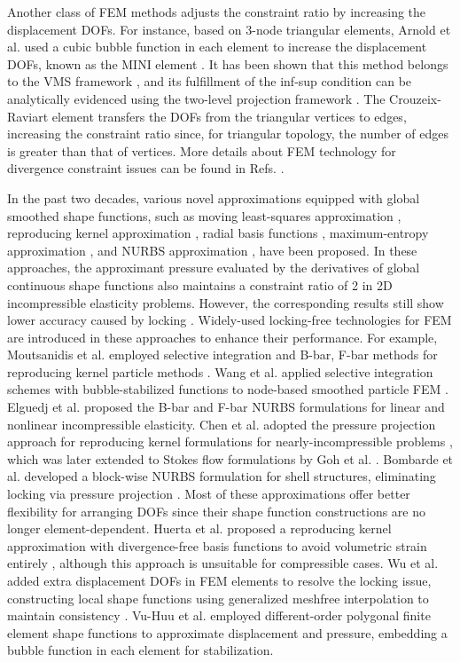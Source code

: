 Another class of FEM methods adjusts the constraint ratio by increasing the displacement DOFs. For instance, based on 3-node triangular elements, Arnold et al. used a cubic bubble function in each element to increase the displacement DOFs, known as the MINI element \cite{arnold1984,auricchio2005}. It has been shown that this method belongs to the VMS framework \cite{quarteroni1994}, and its fulfillment of the inf-sup condition can be analytically evidenced using the two-level projection framework \cite{brezzi}. The Crouzeix-Raviart element \cite{crouzeix1973} transfers the DOFs from the triangular vertices to edges, increasing the constraint ratio since, for triangular topology, the number of edges is greater than that of vertices. More details about FEM technology for divergence constraint issues can be found in Refs. \cite{hughes2000,bathe1996,brink1996}.

In the past two decades, various novel approximations equipped with global smoothed shape functions, such as moving least-squares approximation \cite{belytschko1994}, reproducing kernel approximation \cite{liu1995}, radial basis functions \cite{chi2014,wang2020d}, maximum-entropy approximation \cite{ortiz-bernardin2015}, and NURBS approximation \cite{hughes2005,auricchio2010}, have been proposed. In these approaches, the approximant pressure evaluated by the derivatives of global continuous shape functions also maintains a constraint ratio of 2 in 2D incompressible elasticity problems. However, the corresponding results still show lower accuracy caused by locking \cite{huerta2001,dolbow1999a}. Widely-used locking-free technologies for FEM are introduced in these approaches to enhance their performance. For example, Moutsanidis et al. employed selective integration and B-bar, F-bar methods for reproducing kernel particle methods \cite{moutsanidis2020,moutsanidis2021}. Wang et al. applied selective integration schemes with bubble-stabilized functions to node-based smoothed particle FEM \cite{wang2022c}. Elguedj et al. proposed the B-bar and F-bar NURBS formulations for linear and nonlinear incompressible elasticity. Chen et al. adopted the pressure projection approach for reproducing kernel formulations for nearly-incompressible problems \cite{chen2000}, which was later extended to Stokes flow formulations by Goh et al. \cite{goh2018}. Bombarde et al. developed a block-wise NURBS formulation for shell structures, eliminating locking via pressure projection \cite{bombarde2022}. Most of these approximations offer better flexibility for arranging DOFs since their shape function constructions are no longer element-dependent. Huerta et al. proposed a reproducing kernel approximation with divergence-free basis functions to avoid volumetric strain entirely \cite{huerta2004a}, although this approach is unsuitable for compressible cases. Wu et al. added extra displacement DOFs in FEM elements to resolve the locking issue, constructing local shape functions using generalized meshfree interpolation to maintain consistency \cite{wu2012}. Vu-Huu et al. employed different-order polygonal finite element shape functions to approximate displacement and pressure, embedding a bubble function in each element for stabilization.

